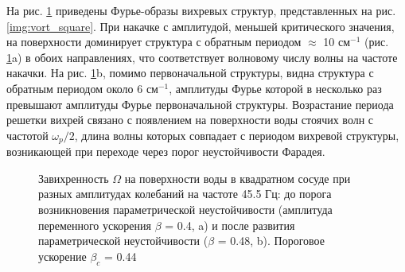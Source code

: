 На рис. \ref{img:fft_square} приведены Фурье-образы вихревых структур, представленных на рис. \ref{img:vort_square}. При накачке с амплитудой, меньшей критического значения, на поверхности доминирует структура с обратным периодом $\approx$ 10 см$^{-1}$ (рис. \ref{img:fft_square}a) в обоих направлениях, что соответствует волновому числу волны на частоте накачки. На рис. \ref{img:fft_square}b, помимо первоначальной структуры, видна структура с обратным периодом около 6 см$^{-1}$, амплитуды Фурье которой в несколько раз превышают амплитуды Фурье первоначальной структуры. Возрастание периода решетки вихрей связано с появлением на поверхности воды стоячих волн с частотой $\omega_p/2$, длина волны которых совпадает с периодом вихревой структуры, возникающей при переходе через порог неустойчивости Фарадея. 


\begin{figure}[ht]
  \begin{minipage}[ht]{0.49\linewidth}
  \end{minipage}
  \hfill
  \begin{minipage}[ht]{0.49\linewidth}
  \end{minipage}
  \caption{Завихренность $\Omega$ на поверхности воды в квадратном сосуде при разных амплитудах колебаний на частоте 45.5 Гц: до порога возникновения параметрической неустойчивости (амплитуда переменного ускорения $\beta$ = 0.4, a) и после развития параметрической неустойчивости ($\beta$ = 0.48, b). Пороговое ускорение $\beta_c$ = 0.44}
  \label{img:fft_square}  
\end{figure}

